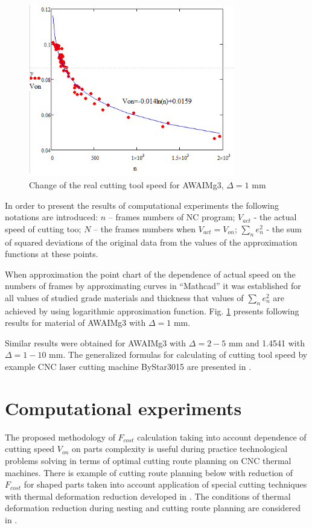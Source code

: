 \documentclass[runningheads]{llncs}
\begin{document}
\begin{figure}
  \begin{center}
  \includegraphics[width=0.8\textwidth]{plot.png}
  \caption{Change of the real cutting tool speed for AWAIMg3, $\Delta=1$ mm}
  \label{plot}
  \end{center}
\end{figure}

In order to present the results of computational experiments
the following notations are introduced:
$n$ – frames numbers of NC program;
$V_{act}$ - the actual speed of cutting too;
$N$ – the frames numbers when $V_{act}=V_{on}$;
$\sum_n e_n^2$  - the sum of squared deviations of the
original data from the values of the approximation functions at these points.

When approximation the point chart
of the dependence of actual speed
on the numbers of frames by approximating curves in ``Mathcad''
it was established for all values of studied grade materials
and thickness that values of $\sum_n e_n^2$
are achieved by using logarithmic approximation function.
Fig. \ref{plot} presents following results for material of AWAIMg3 with $\Delta=1$ mm.

Similar results were obtained for AWAIMg3 with $\Delta=2-5$ mm
and 1.4541 with $\Delta=1-10$ mm.
The generalized formulas for calculating of cutting tool speed
by example CNC laser cutting machine ByStar3015 are presented in \cite{ru28}.

\section{Computational experiments}

The proposed methodology of
$F_{cost}$
calculation taking into account dependence of cutting speed
$V_{on}$
on parts complexity is useful during
practice technological problems solving
in terms of optimal cutting route planning on CNC thermal machines.
There is example of cutting route planning below with reduction of
$F_{cost}$
for shaped parts taken into account
application of special cutting techniques
with thermal deformation reduction developed in \cite{ru26}.
The conditions of thermal deformation reduction
during nesting and cutting route planning are considered in \cite{ru01}.
\end{document}
